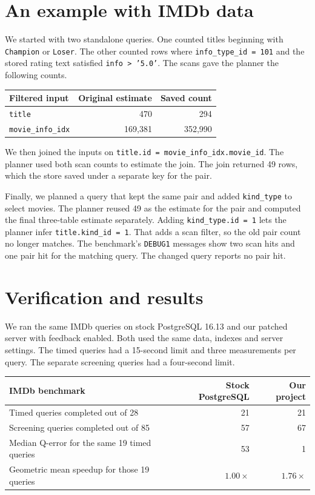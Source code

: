 \documentclass[11pt,a4paper]{article}
\begin{document}
\section*{An example with IMDb data}
We started with two standalone queries. One counted titles beginning with
\texttt{Champion} or \texttt{Loser}. The other counted rows where
\texttt{info\_type\_id = 101} and the stored rating text satisfied
\texttt{info > '5.0'}. The scans gave the planner the following counts.

\begin{tabularx}{\linewidth}{@{}Xrr@{}}
\toprule
\textbf{Filtered input} & \textbf{Original estimate} & \textbf{Saved count} \\
\midrule
\texttt{title} & 470 & 294 \\
\texttt{movie\_info\_idx} & 169,381 & 352,990 \\
\bottomrule
\end{tabularx}

We then joined the inputs on \texttt{title.id = movie\_info\_idx.movie\_id}.
The planner used both scan counts to estimate the join. The join returned
49 rows, which the store saved under a separate key for the pair.

Finally, we planned a query that kept the same pair and added
\texttt{kind\_type} to select movies. The planner reused 49 as the estimate
for the pair and computed the final three-table estimate separately.
Adding \texttt{kind\_type.id = 1} lets the planner infer
\texttt{title.kind\_id = 1}. That adds a scan filter, so the old pair count
no longer matches. The benchmark's \texttt{DEBUG1} messages show two scan
hits and one pair hit for the matching query. The changed query reports no
pair hit.

\newpage

\section*{Verification and results}
We ran the same IMDb queries on stock PostgreSQL 16.13 and our patched server
with feedback enabled. Both used the same data, indexes and server settings.
The timed queries had a 15-second limit and three measurements per query.
The separate screening queries had a four-second limit.

\begin{tabularx}{\linewidth}{@{}Xrr@{}}
\toprule
\textbf{IMDb benchmark} & \textbf{Stock PostgreSQL} & \textbf{Our project} \\
\midrule
Timed queries completed out of 28 & 21 & 21 \\
Screening queries completed out of 85 & 57 & 67 \\
Median Q-error for the same 19 timed queries & 53 & 1 \\
Geometric mean speedup for those 19 queries & \(1.00\times\) & \(1.76\times\) \\
\bottomrule
\end{tabularx}
\end{document}
